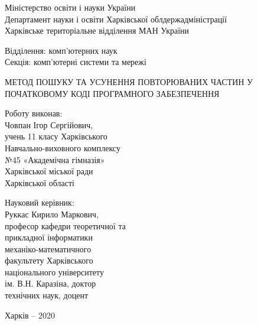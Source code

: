 \documentclass[a4paper, 14pt]{article}
\begin{document}
\thispagestyle{empty}
\begin{spacing}{1}
\begin{center}
Міністерство освіти і науки України\\
Департамент науки і освіти Харківської облдержадміністрації\\
Харківське територіальне відділення МАН України\\
\end{center}\par\null\par
\begin{changemargin}{10cm}{0cm}
Відділення: комп'ютерних наук\\
Секція: комп'ютерні системи та мережі
\end{changemargin}\par\null\par
\begin{center}
МЕТОД ПОШУКУ ТА УСУНЕННЯ ПОВТОРЮВАНИХ
ЧАСТИН У ПОЧАТКОВОМУ КОДІ ПРОГРАМНОГО ЗАБЕЗПЕЧЕННЯ
\end{center}\par\null\par\null
\begin{changemargin}{10cm}{0cm}
Роботу виконав:\\ 
Човпан Ігор Сергійович,\\
учень 11 класу Харківського\\
Навчально-виховного комплексу\\
№45 «Академічна гімназія»\\
Харківської міської ради\\
Харківської області
\end{changemargin}\par
\begin{changemargin}{10cm}{0cm}
Науковий керівник:\\
Руккас Кирило Маркович,\\
професор кафедри теоретичної та\\
прикладної інформатики\\
механіко-математичного\\
факультету Харківського\\
національного університету\\
ім. В.Н. Каразіна, доктор\\
технічних наук, доцент\\
\vspace*{\fill}\end{changemargin}
\begin{center}
Харків -- 2020
\end{center}\end{spacing}
\end{document}
